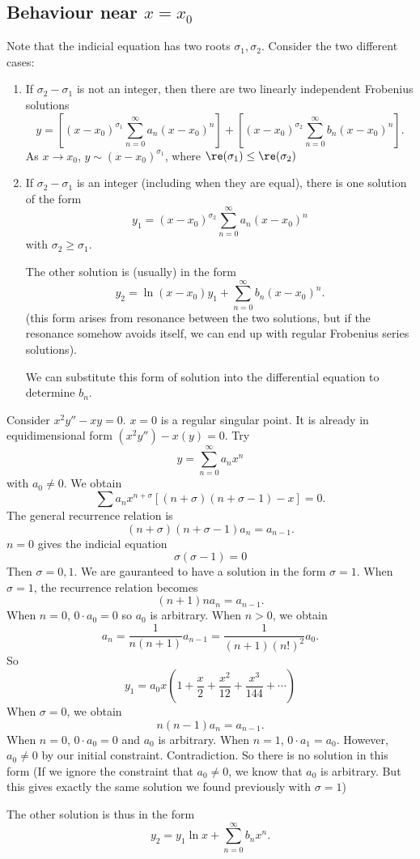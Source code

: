 \documentclass[a4paper]{article}
\begin{document}
\subsection{Behaviour near \texorpdfstring{$x = x_0$}{x = x0}}
Note that the indicial equation has two roots $\sigma_1, \sigma_2$. Consider the two different cases:
\begin{enumerate}
\item If $\sigma_2 - \sigma_1$ is not an integer, then there are two linearly independent Frobenius solutions
\[
y = \left[(x - x_0)^{\sigma_1}\sum_{n = 0}^{\infty} a_n(x - x_0)^n\right] + \left[(x - x_0)^{\sigma_2}\sum_{n = 0}^{\infty} b_n(x - x_0)^n\right].
\]
As $x\to x_0$, $y \sim (x - x_0)^{\sigma_1}$, where $\re(\sigma_1) \leq \re(\sigma_2)$

\item If $\sigma_2 - \sigma_1$ is an integer (including when they are equal), there is one solution of the form
\[
y_1 = (x - x_0)^{\sigma_2}\sum_{n = 0}^{\infty} a_n(x - x_0)^n
\]
with $\sigma_2 \geq \sigma_1$.

The other solution is (usually) in the form
\[
y_2 = \ln(x - x_0)y_1 + \sum_{n = 0}^\infty b_n(x - x_0)^n.
\]
(this form arises from resonance between the two solutions, but if the resonance somehow avoids itself, we can end up with regular Frobenius series solutions).

We can substitute this form of solution into the differential equation to determine $b_n$.

\end{enumerate}
\begin{eg}
  Consider $x^2 y'' - xy = 0$. $x = 0$ is a regular singular point. It is already in equidimensional form $(x^2y'') - x(y) = 0$. Try
\[
y = \sum_{n = 0}^\infty a_n x^n
\]
with $a_0 \not= 0$. We obtain
\[
\sum a_nx^{n + \sigma}[(n + \sigma)(n + \sigma - 1) - x] = 0.
\]
The general recurrence relation is
\[
(n + \sigma)(n + \sigma - 1)a_n = a_{n - 1}.
\]
$n = 0$ gives the indicial equation
\[
\sigma(\sigma - 1) = 0
\]
Then $\sigma = 0, 1$. We are gauranteed to have a solution in the form $\sigma = 1$. When $\sigma = 1$, the recurrence relation becomes
\[
(n + 1)n a_n = a_{n - 1}.
\]
When $n = 0$, $0\cdot a_0 = 0$ so $a_0$ is arbitrary.
When $n > 0$, we obtain
\[
a_n = \frac{1}{n(n +1)}a_{n - 1} = \frac{1}{(n + 1)(n!)^2}a_0.
\]
So
\[
y_1 = a_0x\left(1 + \frac{x}{2} + \frac{x^2}{12} + \frac{x^3}{144} + \cdots \right)
\]
When $\sigma = 0$, we obtain 
\[
n(n - 1)a_n = a_{n - 1}.
\]
When $n = 0$, $0\cdot a_0 = 0$ and $a_0$ is arbitrary. When $n = 1$, $0\cdot a_1 = a_0$. However, $a_0\not= 0$ by our initial constraint. Contradiction. So there is no solution in this form (If we ignore the constraint that $a_0\not= 0$, we know that $a_0$ is arbitrary. But this gives exactly the same solution we found previously with $\sigma = 1$)

The other solution is thus in the form 
\[
y_2 = y_1\ln x + \sum_{n = 0}^\infty b_nx^n.
\]
\end{eg}
\end{document}
